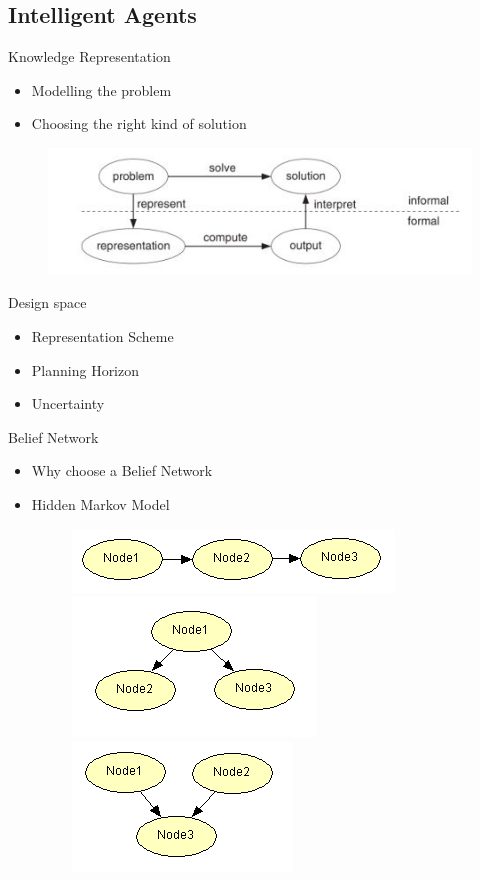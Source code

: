 \subsection{Intelligent Agents}
\begin{frame}{Knowledge Representation}
\begin{itemize}
  \item Modelling the problem
  \item Choosing the right kind of solution
\end{itemize}
\begin{figure}
  \includegraphics[scale=0.5]{figures/MIRep.JPG}
\end{figure}
\end{frame}

\begin{frame}{Design space}
\begin{itemize}
\item Representation Scheme
\item Planning Horizon
\item Uncertainty
\end{itemize}
\end{frame}

\begin{frame}{Belief Network}
\begin{itemize}
 \item Why choose a Belief Network
 \item Hidden Markov Model
 \begin{figure}
  \includegraphics[scale=0.4]{figures/Serial2.PNG}
  \includegraphics[scale=0.4]{figures/Divergent2.PNG}
  \includegraphics[scale=0.4]{figures/Convergent2.PNG}
\end{figure}
\end{itemize}
\end{frame}

